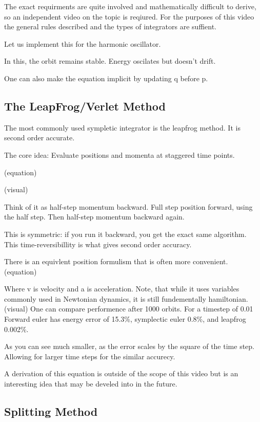 The exact requirments are quite involved and mathematically difficult to derive, so an independent video on the topic is reqiured. For the purposes of this video the general rules described and the types of integrators are suffient.

Let us implement this for the harmonic oscillator.

In this, the orbit remains stable. Energy oscilates but doesn't drift.

One can also make the equation implicit by updating q before p.

\subsection{The LeapFrog/Verlet Method}

The most commonly used sympletic integrator is the leapfrog method. It is second order accurate.

The core idea: Evaluate positions and momenta at staggered time points.

(equation)

(visual)

Think of it as half-step momentum backward. Full step position forward, using the half step. Then half-step momentum backward again.

This is symmetric: if you run it backward, you get the exact same algorithm. This time-reversibillity is what gives second order accuracy.

There is an equivlent position formulism that is often more convenient.
(equation)

Where v is velocity and a is acceleration. Note, that while it uses variables commonly used in Newtonian dynamics, it is still fundementally hamiltonian.
(visual)
One can compare performence after 1000 orbits. For a timestep of 0.01 Forward euler has energy error of 15.3\%, symplectic euler 0.8\%, and leapfrog 0.002\%.

As you can see much smaller, as the error scales by the square of the time step. Allowing for larger time steps for the similar accurecy.

A derivation of this equation is outside of the scope of this video but is an interesting idea that may be develed into in the future.

\subsection{Splitting Method}

